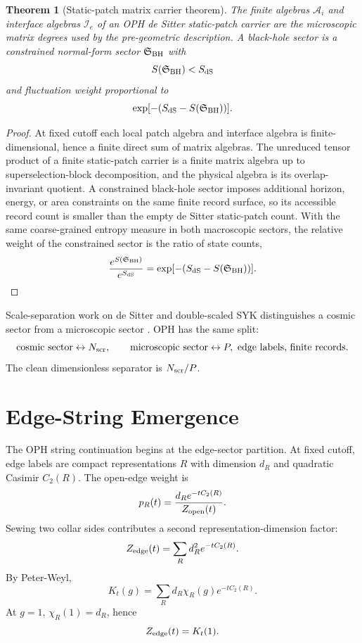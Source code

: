 \documentclass[11pt]{article}
\newtheorem{theorem}{Theorem}[section]
\theoremstyle{remark}
\theoremstyle{plain}
\newcommand{\calA}{\mathcal A}
\newcommand{\calI}{\mathcal I}
\begin{document}
\begin{theorem}[Static-patch matrix carrier theorem]
The finite algebras \(\calA_i\) and interface algebras \(\calI_e\) of an OPH de Sitter
static-patch carrier are the microscopic matrix degrees used by the pre-geometric description.
A black-hole sector is a constrained normal-form sector \(\mathfrak S_{\rm BH}\) with
\[
S(\mathfrak S_{\rm BH})<S_{\rm dS}
\]
and fluctuation weight proportional to
\[
\exp[-(S_{\rm dS}-S(\mathfrak S_{\rm BH}))].
\]
\end{theorem}

\begin{proof}
At fixed cutoff each local patch algebra and interface algebra is finite-dimensional, hence a finite
direct sum of matrix algebras. The unreduced tensor product of a finite static-patch carrier is a
finite matrix algebra up to superselection-block decomposition, and the physical algebra is its
overlap-invariant quotient. A constrained black-hole sector imposes additional horizon, energy, or
area constraints on the same finite record surface, so its accessible record count is smaller than
the empty de Sitter static-patch count. With the same coarse-grained entropy measure in both
macroscopic sectors, the relative weight of the constrained sector is the ratio of state counts,
\[
\frac{e^{S(\mathfrak S_{\rm BH})}}{e^{S_{\rm dS}}}
=\exp[-(S_{\rm dS}-S(\mathfrak S_{\rm BH}))].
\]
\end{proof}

Scale-separation work on de Sitter and double-scaled SYK distinguishes a cosmic sector from a
microscopic sector \cite{DSScales2022}. OPH has the same split:
\[
\text{cosmic sector}\leftrightarrow N_{\rm scr},
\qquad
\text{microscopic sector}\leftrightarrow P,\text{ edge labels, finite records}.
\]
The clean dimensionless separator is \(N_{\rm scr}/P\).

\section{Edge-String Emergence}

The OPH string continuation begins at the edge-sector partition. At fixed cutoff, edge labels are
compact representations \(R\) with dimension \(d_R\) and quadratic Casimir \(C_2(R)\). The
open-edge weight is
\[
p_R(t)=\frac{d_R e^{-t C_2(R)}}{Z_{\rm open}(t)}.
\]
Sewing two collar sides contributes a second representation-dimension factor:
\[
Z_{\rm edge}(t)=\sum_R d_R^2 e^{-tC_2(R)}.
\]
By Peter-Weyl,
\[
K_t(g)=\sum_R d_R\chi_R(g)e^{-tC_2(R)}.
\]
At \(g=1\), \(\chi_R(1)=d_R\), hence
\[
Z_{\rm edge}(t)=K_t(1).
\]
\end{document}
